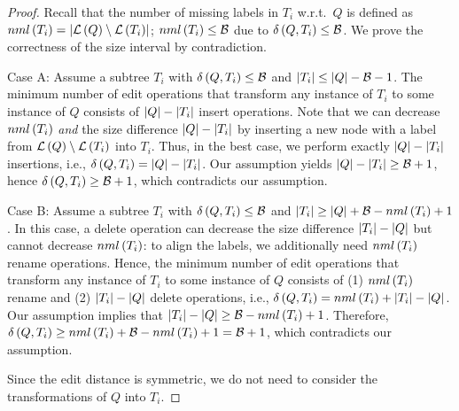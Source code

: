 \begin{proof}
Recall that the number of missing labels in $T_i$ w.r.t.\ $Q$ is defined as $nml \left( T_i \right) = \left| \mathcal{L} \left( Q \right) \setminus \mathcal{L} \left( T_i \right) \right|$; $nml \left( T_i \right) \leq \mathcal{B}$ due to $\delta \left( Q, T_i \right) \leq \mathcal{B}$. We prove the correctness of the size interval by contradiction.

Case A: Assume a subtree $T_i$ with $\delta \left( Q, T_i \right) \leq \mathcal{B}$ and $\left| T_i \right| \leq \left| Q \right| - \mathcal{B} - 1$. The minimum number of edit operations that transform any instance of $T_i$ to some instance of $Q$ consists of $\left| Q \right| - \left| T_i \right|$ insert operations.
%
Note that we can decrease $nml \left( T_i \right)$ \emph{and} the size difference $\left| Q \right| - \left| T_i \right|$ by inserting a new node with a label from $\mathcal{L} \left( Q \right) \setminus \mathcal{L} \left( T_i \right)$ into $T_i$. Thus, in the best case, we perform exactly $\left| Q \right| - \left| T_i \right|$ insertions, i.e., $\delta \left( Q, T_i \right) = \left| Q \right| - \left| T_i \right|$.
%
Our assumption yields $\left| Q \right| - \left| T_i \right| \geq \mathcal{B} + 1$, hence $\delta \left( Q, T_i \right) \geq \mathcal{B} + 1$, which contradicts our assumption.

Case B: Assume a subtree $T_i$ with $\delta \left( Q, T_i \right) \leq \mathcal{B}$ and $\left| T_i \right| \geq \left| Q \right| + \mathcal{B} - nml \left( T_i \right) + 1$. In this case, a delete operation can decrease the size difference $\left| T_i \right| - \left| Q \right|$ but cannot decrease $nml \left( T_i \right)$: to align the labels, we additionally need $nml \left( T_i \right)$ rename operations.
%
Hence, the minimum number of edit operations that transform any instance of $T_i$ to some instance of $Q$ consists of (1) $nml \left( T_i \right)$ rename and (2) $\left| T_i \right| - \left| Q \right|$ delete operations, i.e., $\delta \left( Q, T_i \right) = nml \left( T_i \right) + \left| T_i \right| - \left| Q \right|$.
%
Our assumption implies that $\left| T_i \right| - \left| Q \right| \geq \mathcal{B} - nml \left( T_i \right) + 1$. Therefore, $\delta \left( Q, T_i \right) \geq nml \left( T_i \right) + \mathcal{B} - nml \left( T_i \right) + 1 = \mathcal{B} + 1$, which contradicts our assumption.

Since the edit distance is symmetric, we do not need to consider the transformations of $Q$ into $T_i$.
\end{proof}

\theoremconeecorrectnessscoreorder*

